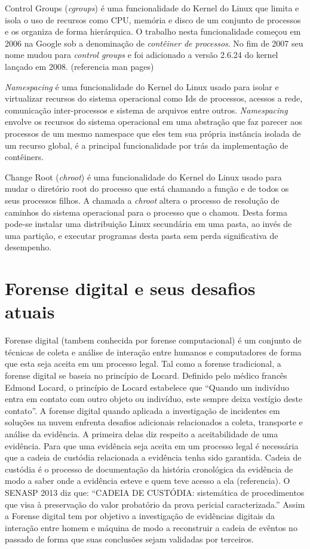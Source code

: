 Control Groups (\textit{cgroups}) é uma funcionalidade do Kernel do Linux que limita e isola o uso de recursos como CPU, memória e disco de um conjunto de processos e os organiza de forma hierárquica. 
%
O trabalho nesta funcionalidade começou em 2006 na Google sob a denominação de \textit{contêiner de processos}. No fim de 2007 seu nome mudou para \textit{control groups} e foi adicionado a versão 2.6.24 do kernel lançado em 2008. (referencia man pages)

\textit{Namespacing} é uma funcionalidade do Kernel do Linux usado para isolar e virtualizar recursos do sistema operacional como Ids de processos, acessos a rede, comunicação inter-processos e sistema de arquivos entre outros.
%
\textit{Namespacing} envolve os recursos do sistema operacional em uma abstração que faz parecer aos processos de um mesmo namespace que eles tem sua própria instância isolada de um recurso global, é a principal funcionalidade por trás da implementação de contêiners.

Change Root (\textit{chroot}) é uma funcionalidade do Kernel do Linux usado para mudar o diretório root do processo que está chamando a função e de todos os seus processos filhos. 
%
A chamada a \textit{chroot} altera o processo de resolução de caminhos do sistema operacional para o processo que o chamou.
%
Desta forma pode-se instalar uma distribuição Linux secundária em uma pasta, ao invés de uma partição, e executar programas desta pasta sem perda significativa de desempenho.

\section{Forense digital e seus desafios atuais}
\label{sec:forensedigital}

Forense digital (tambem conhecida por forense computacional) é um conjunto de técnicas de coleta e análise de interação entre humanos e computadores de forma que esta seja aceita em um processo legal.
%
Tal como a forense tradicional, a forense digital se baseia no princípio de Locard. Definido pelo médico francês Edmond Locard, o princípio de Locard estabelece que ``Quando um indivíduo entra em contato com outro objeto ou indivíduo, este sempre deixa vestígio deste contato''. \cite{Ramos:2011}
%
A forense digital quando aplicada a investigação de incidentes em soluções na nuvem enfrenta desafios adicionais relacionados a coleta, transporte e análise da evidência.
%
A primeira delas diz respeito a aceitabilidade de uma evidência. Para que uma evidência seja aceita em um processo legal é necessária que a cadeia de custódia relacionada a evidência tenha sido garantida.
%
Cadeia de custódia é o processo de documentação da história cronológica da evidência de modo a saber onde a evidência esteve e quem teve acesso a ela (referencia). O SENASP 2013 diz que: ``CADEIA DE CUSTÓDIA: sistemática de procedimentos que visa à preservação do valor probatório da prova pericial caracterizada.''
%
Assim a Forense digital tem por objetivo a investigação de evidências digitais da interação entre homem e máquina de modo a reconstruir a cadeia de evêntos no passado de forma que suas conclusões sejam validadas por terceiros.


